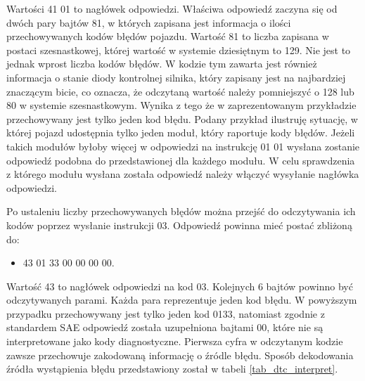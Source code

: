 \documentclass[12pt]{article} %
\numberwithin{equation}{subsection}
\numberwithin{figure}{section}
\numberwithin{table}{section}
\begin{document}
		Wartości 41 01 to nagłówek odpowiedzi. Właściwa odpowiedź zaczyna się od dwóch pary bajtów 81, w których zapisana jest informacja o ilości przechowywanych kodów błędów pojazdu. Wartość 81 to liczba zapisana w postaci szesnastkowej, której wartość w systemie dziesiętnym to 129. Nie jest to jednak wprost liczba kodów błędów. W kodzie tym zawarta jest również informacja o stanie diody kontrolnej silnika, który zapisany jest na najbardziej znaczącym bicie, co oznacza, że odczytaną wartość należy pomniejszyć o 128 lub 80 w systemie szesnastkowym. Wynika z tego że w zaprezentowanym przykładzie przechowywany jest tylko jeden kod błędu. Podany przykład ilustruję sytuację, w której pojazd udostępnia tylko jeden moduł, który raportuje kody błędów. Jeżeli takich modułów byłoby więcej w odpowiedzi na instrukcję 01 01 wysłana zostanie odpowiedź podobna do przedstawionej dla każdego modułu. W celu sprawdzenia z którego modułu wysłana została odpowiedź należy włączyć wysyłanie nagłówka odpowiedzi.
		
		Po ustaleniu liczby przechowywanych błędów można przejść do odczytywania ich kodów poprzez wysłanie instrukcji 03. Odpowiedź powinna mieć postać zbliżoną do:
		
		\begin{itemize}
			\item{43 01 33 00 00 00 00.}
		\end{itemize}
		
		Wartość 43 to nagłówek odpowiedzi na kod 03. Kolejnych 6 bajtów powinno być odczytywanych parami. Każda para reprezentuje jeden kod błędu. W powyższym przypadku przechowywany jest tylko jeden kod 0133, natomiast zgodnie z standardem SAE odpowiedź została uzupełniona bajtami 00, które nie są interpretowane jako kody diagnostyczne. Pierwsza cyfra w odczytanym kodzie zawsze przechowuje zakodowaną informację o źródle błędu. Sposób dekodowania źródła wystąpienia błędu przedstawiony został w tabeli \ref{tab_dtc_interpret}.
		
		\newpage
		
\end{document}
